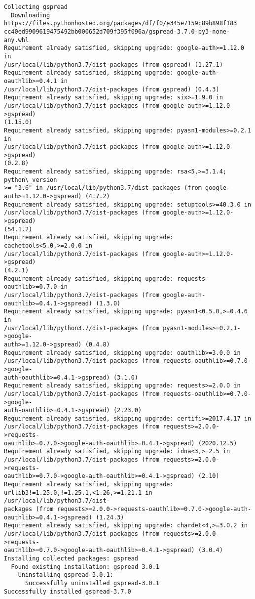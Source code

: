 \documentclass[11pt]{article}
\begin{document}
    \begin{Verbatim}[commandchars=\\\{\}]
Collecting gspread
  Downloading https://files.pythonhosted.org/packages/df/f0/e345e7159c89b898f183
cc40ed9909619475492bb000652d709f395f096a/gspread-3.7.0-py3-none-any.whl
Requirement already satisfied, skipping upgrade: google-auth>=1.12.0 in
/usr/local/lib/python3.7/dist-packages (from gspread) (1.27.1)
Requirement already satisfied, skipping upgrade: google-auth-oauthlib>=0.4.1 in
/usr/local/lib/python3.7/dist-packages (from gspread) (0.4.3)
Requirement already satisfied, skipping upgrade: six>=1.9.0 in
/usr/local/lib/python3.7/dist-packages (from google-auth>=1.12.0->gspread)
(1.15.0)
Requirement already satisfied, skipping upgrade: pyasn1-modules>=0.2.1 in
/usr/local/lib/python3.7/dist-packages (from google-auth>=1.12.0->gspread)
(0.2.8)
Requirement already satisfied, skipping upgrade: rsa<5,>=3.1.4; python\_version
>= "3.6" in /usr/local/lib/python3.7/dist-packages (from google-
auth>=1.12.0->gspread) (4.7.2)
Requirement already satisfied, skipping upgrade: setuptools>=40.3.0 in
/usr/local/lib/python3.7/dist-packages (from google-auth>=1.12.0->gspread)
(54.1.2)
Requirement already satisfied, skipping upgrade: cachetools<5.0,>=2.0.0 in
/usr/local/lib/python3.7/dist-packages (from google-auth>=1.12.0->gspread)
(4.2.1)
Requirement already satisfied, skipping upgrade: requests-oauthlib>=0.7.0 in
/usr/local/lib/python3.7/dist-packages (from google-auth-
oauthlib>=0.4.1->gspread) (1.3.0)
Requirement already satisfied, skipping upgrade: pyasn1<0.5.0,>=0.4.6 in
/usr/local/lib/python3.7/dist-packages (from pyasn1-modules>=0.2.1->google-
auth>=1.12.0->gspread) (0.4.8)
Requirement already satisfied, skipping upgrade: oauthlib>=3.0.0 in
/usr/local/lib/python3.7/dist-packages (from requests-oauthlib>=0.7.0->google-
auth-oauthlib>=0.4.1->gspread) (3.1.0)
Requirement already satisfied, skipping upgrade: requests>=2.0.0 in
/usr/local/lib/python3.7/dist-packages (from requests-oauthlib>=0.7.0->google-
auth-oauthlib>=0.4.1->gspread) (2.23.0)
Requirement already satisfied, skipping upgrade: certifi>=2017.4.17 in
/usr/local/lib/python3.7/dist-packages (from requests>=2.0.0->requests-
oauthlib>=0.7.0->google-auth-oauthlib>=0.4.1->gspread) (2020.12.5)
Requirement already satisfied, skipping upgrade: idna<3,>=2.5 in
/usr/local/lib/python3.7/dist-packages (from requests>=2.0.0->requests-
oauthlib>=0.7.0->google-auth-oauthlib>=0.4.1->gspread) (2.10)
Requirement already satisfied, skipping upgrade:
urllib3!=1.25.0,!=1.25.1,<1.26,>=1.21.1 in /usr/local/lib/python3.7/dist-
packages (from requests>=2.0.0->requests-oauthlib>=0.7.0->google-auth-
oauthlib>=0.4.1->gspread) (1.24.3)
Requirement already satisfied, skipping upgrade: chardet<4,>=3.0.2 in
/usr/local/lib/python3.7/dist-packages (from requests>=2.0.0->requests-
oauthlib>=0.7.0->google-auth-oauthlib>=0.4.1->gspread) (3.0.4)
Installing collected packages: gspread
  Found existing installation: gspread 3.0.1
    Uninstalling gspread-3.0.1:
      Successfully uninstalled gspread-3.0.1
Successfully installed gspread-3.7.0
    \end{Verbatim}
\end{document}
